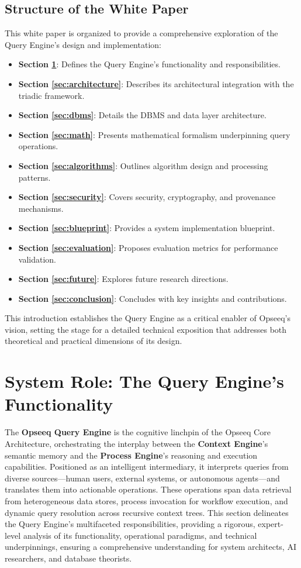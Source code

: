\documentclass[11pt]{article}
\begin{document}
\subsection{Structure of the White Paper}
This white paper is organized to provide a comprehensive exploration of the Query Engine’s design and implementation:
\begin{itemize}
    \item \textbf{Section \ref{sec:role}}: Defines the Query Engine’s functionality and responsibilities.
    \item \textbf{Section \ref{sec:architecture}}: Describes its architectural integration with the triadic framework.
    \item \textbf{Section \ref{sec:dbms}}: Details the DBMS and data layer architecture.
    \item \textbf{Section \ref{sec:math}}: Presents mathematical formalism underpinning query operations.
    \item \textbf{Section \ref{sec:algorithms}}: Outlines algorithm design and processing patterns.
    \item \textbf{Section \ref{sec:security}}: Covers security, cryptography, and provenance mechanisms.
    \item \textbf{Section \ref{sec:blueprint}}: Provides a system implementation blueprint.
    \item \textbf{Section \ref{sec:evaluation}}: Proposes evaluation metrics for performance validation.
    \item \textbf{Section \ref{sec:future}}: Explores future research directions.
    \item \textbf{Section \ref{sec:conclusion}}: Concludes with key insights and contributions.
\end{itemize}

This introduction establishes the Query Engine as a critical enabler of Opseeq’s vision, setting the stage for a detailed technical exposition that addresses both theoretical and practical dimensions of its design.


\section{System Role: The Query Engine’s Functionality}
\label{sec:role}

The \textbf{Opseeq Query Engine} is the cognitive linchpin of the Opseeq Core Architecture, orchestrating the interplay between the \textbf{Context Engine}’s semantic memory and the \textbf{Process Engine}’s reasoning and execution capabilities. Positioned as an intelligent intermediary, it interprets queries from diverse sources—human users, external systems, or autonomous agents—and translates them into actionable operations. These operations span data retrieval from heterogeneous data stores, process invocation for workflow execution, and dynamic query resolution across recursive context trees. This section delineates the Query Engine’s multifaceted responsibilities, providing a rigorous, expert-level analysis of its functionality, operational paradigms, and technical underpinnings, ensuring a comprehensive understanding for system architects, AI researchers, and database theorists.
\end{document}
